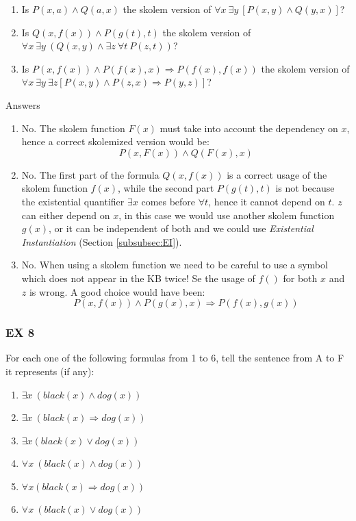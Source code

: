 \documentclass[10pt,a4paper]{article}
\begin{document}
\begin{enumerate}


\item Is $ P(x,a)\wedge Q(a,x)$ the skolem version of $\forall x\ \exists y\ [P(x,y)\wedge Q(y,x)]$?
\item Is $ Q(x,f(x))\wedge P(g(t),t)$ the skolem version of $\forall x\ \exists y\ (Q(x,y)\wedge \exists z\ \forall t\ P(z,t))$?
\item Is $P(x,f(x))\wedge P(f(x),x)\Rightarrow P(f(x),f(x))$ the skolem version of $\forall x\ \exists y\  \exists z[P(x,y)\wedge P(z,x)\Rightarrow P(y,z)]$?
\end{enumerate}
Answers
\begin{enumerate}
\item No. The skolem function $F(x)$ must take into account the dependency on $x$, hence a correct skolemized version would be:
\[P(x,F(x))\wedge Q(F(x),x)\]
\item No. The first part of the formula $Q(x,f(x))$ is a correct usage of the skolem function $f(x)$, while the second part $P(g(t),t)$ is not because the existential quantifier  $\exists x$ comes before $\forall t$, hence it cannot depend on $t$. $z$ can either depend on $x$, in this case we would use another skolem function $g(x)$, or it can be independent of both and we could use \textit{Existential Instantiation} (Section \ref{subsubsec:EI}). 
\item No. When using a skolem function we need to be careful to use a symbol which does not appear in the KB twice! Se the usage of $f()$ for both $x$ and $z$ is wrong. A good choice would have been:
\[P(x,f(x))\wedge P(g(x),x)\Rightarrow P(f(x),g(x))\]


\end{enumerate}

\subsubsection{EX 8}
For each one of the following formulas from 1 to 6, tell the sentence from A to F it represents (if any):
\begin{enumerate}

\item $\exists x\ (black(x) \wedge dog(x))$
\item $\exists x\ (black(x)\Rightarrow dog(x)) $
\item $\exists x(black(x) \vee dog(x))$
\item $\forall x\ (black(x) \wedge dog(x)) $
\item $\forall x(black(x)\Rightarrow dog(x))$
\item $\forall x\ (black(x) \vee dog(x))$
\end{enumerate}
\end{document}
